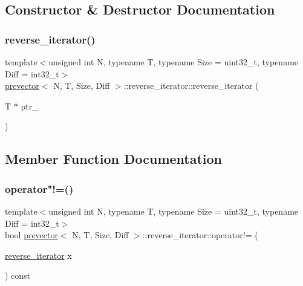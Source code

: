 \subsection{Constructor \& Destructor Documentation}
\mbox{\label{classprevector_1_1reverse__iterator_adcb8cb50c73bf5712bb8a2b66d744e4c}} 
\subsubsection{\texorpdfstring{reverse\+\_\+iterator()}{reverse\_iterator()}}
{\footnotesize\ttfamily template$<$unsigned int N, typename T, typename Size = uint32\+\_\+t, typename Diff = int32\+\_\+t$>$ \\
\mbox{\hyperlink{classprevector}{prevector}}$<$ N, T, Size, Diff $>$\+::reverse\+\_\+iterator\+::reverse\+\_\+iterator (\begin{DoxyParamCaption}\item[{T $\ast$}]{ptr\+\_\+ }\end{DoxyParamCaption})\hspace{0.3cm}{\ttfamily [inline]}}



\subsection{Member Function Documentation}
\mbox{\label{classprevector_1_1reverse__iterator_ab77234832f8d03e55510a13290954ba4}} 
\subsubsection{\texorpdfstring{operator"!=()}{operator!=()}}
{\footnotesize\ttfamily template$<$unsigned int N, typename T, typename Size = uint32\+\_\+t, typename Diff = int32\+\_\+t$>$ \\
bool \mbox{\hyperlink{classprevector}{prevector}}$<$ N, T, Size, Diff $>$\+::reverse\+\_\+iterator\+::operator!= (\begin{DoxyParamCaption}\item[{\mbox{\hyperlink{classprevector_1_1reverse__iterator}{reverse\+\_\+iterator}}}]{x }\end{DoxyParamCaption}) const\hspace{0.3cm}{\ttfamily [inline]}}

